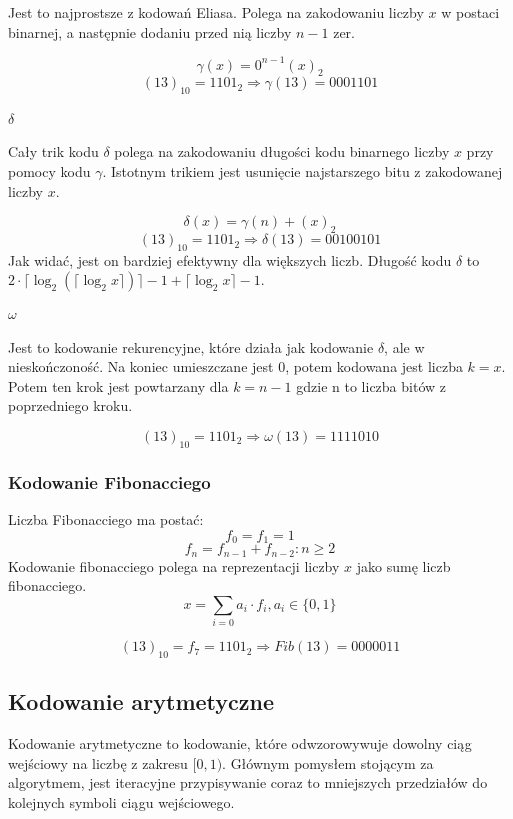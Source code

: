 \documentclass{../notatki}
\begin{document}
Jest to najprostsze z kodowań Eliasa. Polega na zakodowaniu liczby $x$ w
postaci binarnej, a następnie dodaniu przed nią liczby $n-1$ zer.

$$
\gamma(x) = 0^{n-1}(x)_2
$$
$$
(13)_{10} = 1101_2 \Rightarrow \gamma(13) = 0001101
$$

\paragraph{$\delta$}

Cały trik kodu $\delta$ polega na zakodowaniu długości kodu binarnego liczby
$x$ przy pomocy kodu $\gamma$.
Istotnym trikiem jest usunięcie najstarszego bitu z zakodowanej liczby $x$.

$$
\delta(x) = \gamma(n) + (x)_2
$$
$$
(13)_{10} = 1101_2 \Rightarrow \delta(13) = 00 100 101
$$
Jak widać, jest on bardziej efektywny dla większych liczb. Długość kodu
$\delta$ to $2 \cdot \lceil \log_2(\lceil \log_2x \rceil)\rceil - 1 +
\lceil \log_2x \rceil - 1$.

\paragraph{$\omega$}

Jest to kodowanie rekurencyjne, które działa jak kodowanie $\delta$, ale
w nieskończoność.
Na koniec umieszczane jest $0$, potem kodowana jest liczba $k=x$. Potem ten
krok jest powtarzany dla $k=n - 1$ gdzie n to liczba bitów z poprzedniego kroku.

$$
(13)_{10} = 1101_2 \Rightarrow \omega(13) = 11 1101 0
$$

\subsubsection{Kodowanie Fibonacciego}

Liczba Fibonacciego ma postać:
$$
f_0=f_1=1
$$
$$
f_n = f_{n-1} + f_{n-2}: n \geq 2
$$
Kodowanie fibonacciego polega na reprezentacji liczby $x$ jako sumę liczb
fibonacciego.
$$
x = \sum_{i=0} a_i \cdot f_i, a_i \in \{0,1\}
$$

$$
(13)_{10} = f_7 = 1101_2 \Rightarrow Fib(13) = 0000011
$$

\subsection{Kodowanie arytmetyczne}

Kodowanie arytmetyczne to kodowanie, które odwzorowywuje dowolny ciąg wejściowy
na liczbę z zakresu $[0, 1)$. Głównym pomysłem stojącym za algorytmem, jest
iteracyjne przypisywanie coraz to mniejszych przedziałów do kolejnych symboli
ciągu wejściowego.
\end{document}
